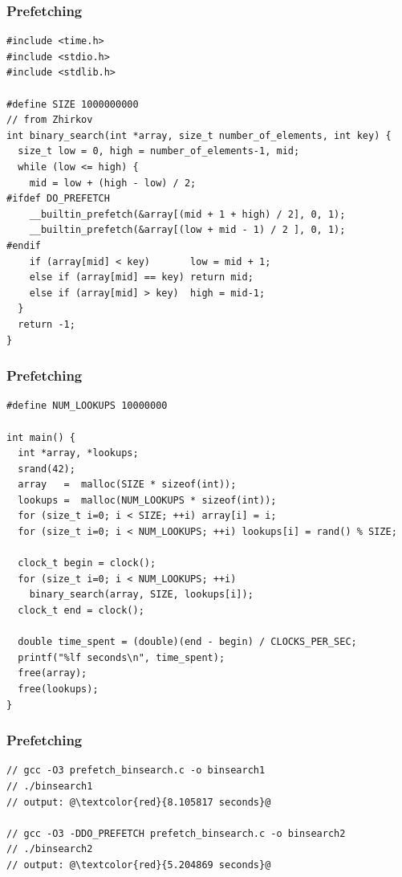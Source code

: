 \documentclass{beamer}
\begin{document}
\begin{frame}[fragile]
\frametitle{Prefetching}
\scriptsize

\begin{lstlisting}[linebackgroundcolor={\lstcolorlines{11,12,13,14}}]
#include <time.h>
#include <stdio.h>
#include <stdlib.h>

#define SIZE 1000000000
// from Zhirkov
int binary_search(int *array, size_t number_of_elements, int key) {
  size_t low = 0, high = number_of_elements-1, mid;
  while (low <= high) {
    mid = low + (high - low) / 2;
#ifdef DO_PREFETCH
    __builtin_prefetch(&array[(mid + 1 + high) / 2], 0, 1);
    __builtin_prefetch(&array[(low + mid - 1) / 2 ], 0, 1);
#endif
    if (array[mid] < key)       low = mid + 1;
    else if (array[mid] == key) return mid;
    else if (array[mid] > key)  high = mid-1;
  }
  return -1;
}
\end{lstlisting}

\end{frame}

\begin{frame}[fragile]
\frametitle{Prefetching}
\scriptsize

\begin{lstlisting}[linebackgroundcolor={\lstcolorlines{8,9,12,13}}]
#define NUM_LOOKUPS 10000000

int main() {
  int *array, *lookups;
  srand(42);
  array   =  malloc(SIZE * sizeof(int));
  lookups =  malloc(NUM_LOOKUPS * sizeof(int));
  for (size_t i=0; i < SIZE; ++i) array[i] = i;
  for (size_t i=0; i < NUM_LOOKUPS; ++i) lookups[i] = rand() % SIZE;

  clock_t begin = clock();
  for (size_t i=0; i < NUM_LOOKUPS; ++i)
    binary_search(array, SIZE, lookups[i]);
  clock_t end = clock();

  double time_spent = (double)(end - begin) / CLOCKS_PER_SEC;
  printf("%lf seconds\n", time_spent);
  free(array);
  free(lookups);
}
\end{lstlisting}

\end{frame}

\begin{frame}[fragile]
\frametitle{Prefetching}
\scriptsize

\begin{lstlisting}
// gcc -O3 prefetch_binsearch.c -o binsearch1
// ./binsearch1
// output: @\textcolor{red}{8.105817 seconds}@

// gcc -O3 -DDO_PREFETCH prefetch_binsearch.c -o binsearch2
// ./binsearch2
// output: @\textcolor{red}{5.204869 seconds}@
\end{lstlisting}

\end{frame}
\end{document}
